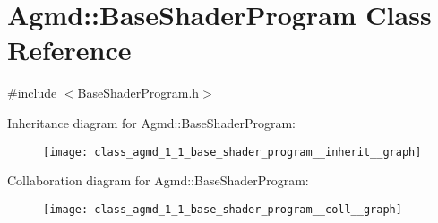 \hypertarget{class_agmd_1_1_base_shader_program}{\section{Agmd\+:\+:Base\+Shader\+Program Class Reference}
\label{class_agmd_1_1_base_shader_program}
}


{\ttfamily \#include $<$Base\+Shader\+Program.\+h$>$}



Inheritance diagram for Agmd\+:\+:Base\+Shader\+Program\+:\nopagebreak
\begin{figure}[H]
\begin{center}
\leavevmode
\texttt{[image: class\_agmd\_1\_1\_base\_shader\_program\_\_inherit\_\_graph]}
\end{center}
\end{figure}


Collaboration diagram for Agmd\+:\+:Base\+Shader\+Program\+:\nopagebreak
\begin{figure}[H]
\begin{center}
\leavevmode
\texttt{[image: class\_agmd\_1\_1\_base\_shader\_program\_\_coll\_\_graph]}
\end{center}
\end{figure}
